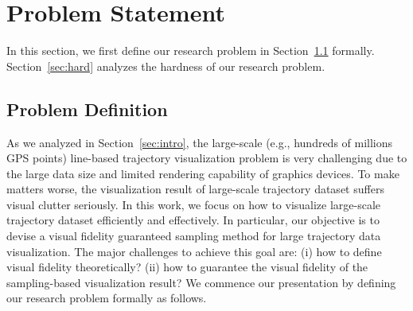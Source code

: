 \section{Problem Statement}\label{sec:pro}
In this section, we first define our research problem in Section~\ref{sec:def} formally.
Section~\ref{sec:hard} analyzes the hardness of our research problem.
%


\subsection{Problem Definition}\label{sec:def}
As we analyzed in Section~\ref{sec:intro}, the large-scale (e.g., hundreds of millions GPS points) line-based trajectory visualization problem is very challenging due to the large data size and limited rendering capability of graphics devices.
To make matters worse, the visualization result of large-scale trajectory dataset suffers visual clutter seriously.
In this work, we focus on how to visualize large-scale trajectory dataset efficiently and effectively.
In particular, our objective is to devise a visual fidelity guaranteed sampling method for large trajectory data visualization.
The major challenges to achieve this goal are:
(i) how to define visual fidelity theoretically? (ii) how to guarantee the visual fidelity of the sampling-based visualization result?
We commence our presentation by defining our research problem formally as follows.

